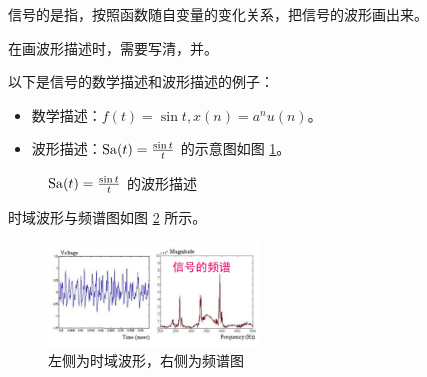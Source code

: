 \begin{definition}[波形描述]
    信号的是指，按照函数随自变量的变化关系，把信号的波形画出来。
\end{definition}

\begin{note}
    在画波形描述时，需要写清，并。
\end{note}

\begin{example}
    以下是信号的数学描述和波形描述的例子：
    \begin{itemize}
        \item 数学描述：$f(t) = \sin t, x(n) = a^nu(n)$。
        \item 波形描述：$\mathrm{Sa}(t) = \frac{\sin t}{t}$ 的示意图如图 \ref{fig:sa-t-wave-description}。
    \end{itemize}
    \begin{figure}[H]
        \centering
        \caption{$\mathrm{Sa}(t) = \frac{\sin t}{t}$ 的波形描述}
        \label{fig:sa-t-wave-description}
    \end{figure}
\end{example}

\begin{example}[时域波形与频谱图]
    时域波形与频谱图如图 \ref{fig:wave-spectrum} 所示。
    \begin{figure}[H]
        \centering
        \includegraphics[width=0.5\textwidth]{chap1/img/wave-spectrum.png}
        \caption{左侧为时域波形，右侧为频谱图}
        \label{fig:wave-spectrum}
    \end{figure}
\end{example}

